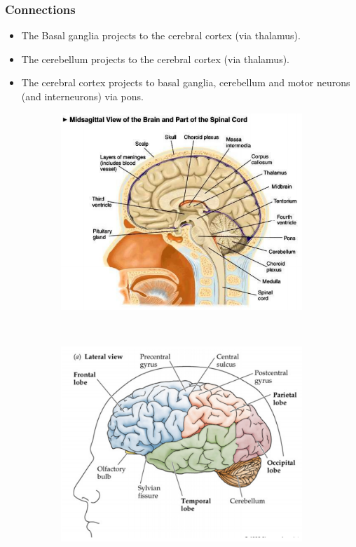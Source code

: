 \documentclass[a4paper, 12pt]{article}
\begin{document}
\subsubsection{Connections}
\begin{itemize}[noitemsep,nolistsep]
	\item The Basal ganglia projects to the cerebral cortex (via thalamus).
	\item The cerebellum projects to the cerebral cortex (via thalamus).
	\item The cerebral cortex projects to basal ganglia, cerebellum and motor neurons (and interneurons) via  pons.
\end{itemize}
\begin{figure}[H]
	\centering
	\begin{subfigure}[b]{0.5\textwidth}
		\centering
		\includegraphics[width=\textwidth]{brain_anatomy_04.png}
	\end{subfigure}%
	~
	\begin{subfigure}[b]{0.5\textwidth}
		\centering
		\includegraphics[width=\textwidth]{brain_anatomy_05.png}
	\end{subfigure}
\end{figure}
\end{document}

